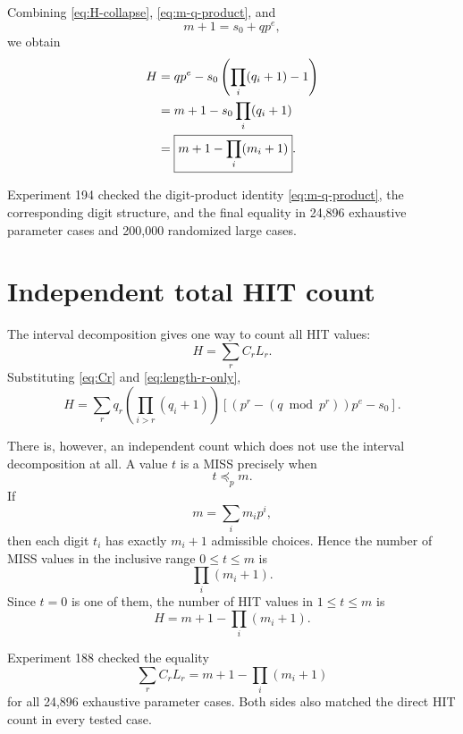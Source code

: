 \documentclass[11pt,a4paper]{article}
\theoremstyle{definition}
\theoremstyle{remark}
\begin{document}
Combining \eqref{eq:H-collapse}, \eqref{eq:m-q-product}, and
\begin{equation}
 m+1=s_0+qp^e,
 \label{eq:mplus1}
\end{equation}
we obtain
\begin{align}
 H
 &=qp^e-s_0\left(\prod_i(q_i+1)-1\right)\notag\\
 &=m+1-s_0\prod_i(q_i+1)\notag\\
 &=\boxed{m+1-\prod_i(m_i+1)}.
 \label{eq:final-count}
\end{align}

Experiment 194 checked the digit-product identity \eqref{eq:m-q-product}, the corresponding digit structure, and the final equality in 24,896 exhaustive parameter cases and 200,000 randomized large cases.

\section{Independent total HIT count}

The interval decomposition gives one way to count all HIT values:
\begin{equation}
 H
 =
 \sum_r C_rL_r.
 \label{eq:weighted-HIT}
\end{equation}
Substituting \eqref{eq:Cr} and \eqref{eq:length-r-only},
\begin{equation}
 \boxed{
 H
 =
 \sum_r
 q_r\left(\prod_{i>r}(q_i+1)\right)
 \left[
 \left(p^r-(q\bmod p^r)\right)p^e-s_0
 \right].
 }
 \label{eq:weighted-explicit}
\end{equation}

There is, however, an independent count which does not use the interval decomposition at all.  A value $t$ is a MISS precisely when
\[
 t\preceq_p m.
\]
If
\[
 m=\sum_i m_i p^i,
\]
then each digit $t_i$ has exactly $m_i+1$ admissible choices.  Hence the number of MISS values in the inclusive range $0\le t\le m$ is
\begin{equation}
 \prod_i(m_i+1).
 \label{eq:miss-count}
\end{equation}
Since $t=0$ is one of them, the number of HIT values in $1\le t\le m$ is
\begin{equation}
 \boxed{
 H=m+1-\prod_i(m_i+1).
 }
 \label{eq:direct-HIT-count}
\end{equation}

Experiment 188 checked the equality
\begin{equation}
 \sum_r C_rL_r
 =
 m+1-\prod_i(m_i+1)
 \label{eq:two-counts}
\end{equation}
for all 24,896 exhaustive parameter cases.  Both sides also matched the direct HIT count in every tested case.
\end{document}
